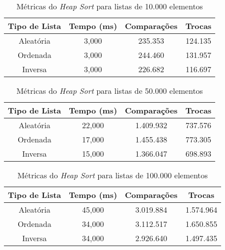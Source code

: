 \documentclass[a4paper,12pt]{article}
\begin{document}
\begin{table}[H]
\centering
\caption{Métricas do \textit{Heap Sort} para listas de 10.000 elementos}
\begin{tabular}{|c|c|c|c|}
\hline
\textbf{Tipo de Lista} & \textbf{Tempo (ms)} & \textbf{Comparações} & \textbf{Trocas} \\ \hline
Aleatória              & 3,000               & 235.353              & 124.135         \\ \hline
Ordenada               & 3,000               & 244.460              & 131.957         \\ \hline
Inversa                & 3,000               & 226.682              & 116.697         \\ \hline
\end{tabular}
\end{table}

\begin{table}[H]
\centering
\caption{Métricas do \textit{Heap Sort} para listas de 50.000 elementos}
\begin{tabular}{|c|c|c|c|}
\hline
\textbf{Tipo de Lista} & \textbf{Tempo (ms)} & \textbf{Comparações} & \textbf{Trocas} \\ \hline
Aleatória              & 22,000              & 1.409.932            & 737.576         \\ \hline
Ordenada               & 17,000              & 1.455.438            & 773.305         \\ \hline
Inversa                & 15,000              & 1.366.047            & 698.893         \\ \hline
\end{tabular}
\end{table}

\begin{table}[H]
\centering
\caption{Métricas do \textit{Heap Sort} para listas de 100.000 elementos}
\begin{tabular}{|c|c|c|c|}
\hline
\textbf{Tipo de Lista} & \textbf{Tempo (ms)} & \textbf{Comparações} & \textbf{Trocas} \\ \hline
Aleatória              & 45,000              & 3.019.884            & 1.574.964       \\ \hline
Ordenada               & 34,000              & 3.112.517            & 1.650.855       \\ \hline
Inversa                & 34,000              & 2.926.640            & 1.497.435       \\ \hline
\end{tabular}
\end{table}
\end{document}

